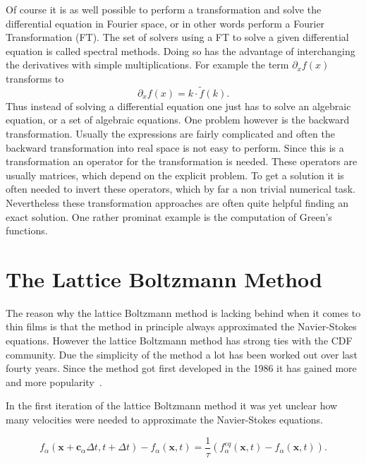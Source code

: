 Of course it is as well possible to perform a transformation and solve the differential equation in Fourier space, or in other words perform a Fourier Transformation (FT).
The set of solvers using a FT to solve a given differential equation is called spectral methods.
Doing so has the advantage of interchanging the derivatives with simple multiplications.
For example the term $\partial_x f(x)$ transforms to  
\begin{equation}\label{eq:fourier_transform}
    \partial_x f(x) = k\cdot \tilde{f}(k).
\end{equation}
Thus instead of solving a differential equation one just has to solve an algebraic equation, or a set of algebraic equations.
One problem however is the backward transformation. 
Usually the expressions are fairly complicated and often the backward transformation into real space is not easy to perform.
Since this is a transformation an operator for the transformation is needed.
These operators are usually matrices, which depend on the explicit problem.
To get a solution it is often needed to invert these operators, which by far a non trivial numerical task.
Nevertheless these transformation approaches are often quite helpful finding an exact solution.
One rather prominat example is the computation of Green's functions.

\section{The Lattice Boltzmann Method}\label{sec:LBM}
The reason why the lattice Boltzmann method is lacking behind when it comes to thin films is that the method in principle always approximated the Navier-Stokes equations.
However the lattice Boltzmann method has strong ties with the CDF community.
Due the simplicity of the method a lot has been worked out over last fourty years.
Since the method got first developed in the 1986 it has gained more and more popularity~\cite{PhysRevLett.56.1505}.

In the first iteration of the lattice Boltzmann method it was yet unclear how many velocities were needed to approximate the Navier-Stokes equations.

\begin{equation}\label{eq:LBM_discret_noforces}
    f_{\alpha}(\mathbf{x}+\mathbf{c}_{\alpha}\Delta t, t+ \Delta t) - f_{\alpha}(\mathbf{x}, t) = \frac{1}{\tau}(f^{eq}_{\alpha}(\mathbf{x}, t)-f_{\alpha}(\mathbf{x}, t)).
\end{equation}

